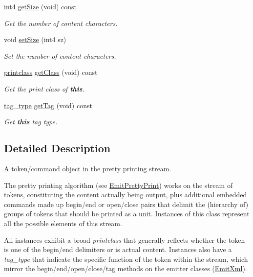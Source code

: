 \begin{DoxyCompactItemize}
int4 \mbox{\hyperlink{class_token_split_acf9542eb5fe9653255b5277cc63c1e6a}{get\+Size}} (void) const
\begin{DoxyCompactList}\small\item\em Get the number of content characters. \end{DoxyCompactList}\item 
void \mbox{\hyperlink{class_token_split_a89a7a7287b0c574e97e5b0acde5e0020}{set\+Size}} (int4 sz)
\begin{DoxyCompactList}\small\item\em Set the number of content characters. \end{DoxyCompactList}\item 
\mbox{\hyperlink{class_token_split_a995222ab6b324567b96a04b69e9bca27}{printclass}} \mbox{\hyperlink{class_token_split_a04ab497b5a634461f0c529c33a86ddf4}{get\+Class}} (void) const
\begin{DoxyCompactList}\small\item\em Get the print class of {\bfseries{this}}. \end{DoxyCompactList}\item 
\mbox{\hyperlink{class_token_split_aeb8df0fee5549b7698495e5b408acc77}{tag\+\_\+type}} \mbox{\hyperlink{class_token_split_a2a88b73a7807210f6e1afd42c09f6a7f}{get\+Tag}} (void) const
\begin{DoxyCompactList}\small\item\em Get {\bfseries{this}} tag type. \end{DoxyCompactList}\end{DoxyCompactItemize}


\subsection{Detailed Description}
A token/command object in the pretty printing stream. 

The pretty printing algorithm (see \mbox{\hyperlink{class_emit_pretty_print}{Emit\+Pretty\+Print}}) works on the stream of tokens, constituting the content actually being output, plus additional embedded commands made up begin/end or open/close pairs that delimit the (hierarchy of) groups of tokens that should be printed as a unit. Instances of this class represent all the possible elements of this stream.

All instances exhibit a broad {\itshape printclass} that generally reflects whether the token is one of the begin/end delimiters or is actual content. Instances also have a {\itshape tag\+\_\+type} that indicate the specific function of the token within the stream, which mirror the begin/end/open/close/tag methods on the emitter classes (\mbox{\hyperlink{class_emit_xml}{Emit\+Xml}}). 

